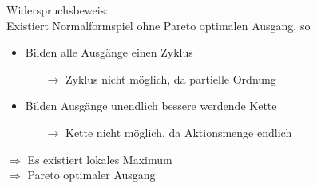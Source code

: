 \documentclass[mathserif, xcolor=divipsnames]{beamer}
\begin{document}
\begin{frame}
{  Widerspruchsbeweis:\\
  Existiert Normalformspiel ohne Pareto optimalen Ausgang, so

  \begin{itemize}
    \item Bilden alle Ausgänge einen Zyklus
    \begin{itemize}
      \item[\boldmath$\rightarrow$] Zyklus nicht möglich, da partielle Ordnung
    \end{itemize}
    \item Bilden Ausgänge unendlich bessere werdende Kette
    \begin{itemize}
      \item[\boldmath$\rightarrow$] Kette nicht möglich, da Aktionsmenge endlich
    \end{itemize}
  \end{itemize}


  $\Rightarrow$ Es existiert lokales Maximum\\
  $\Rightarrow$ Pareto optimaler Ausgang
  }
\end{frame}
\end{document}
